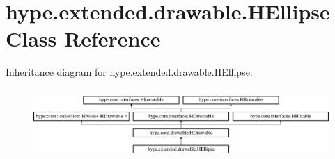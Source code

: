 \hypertarget{classhype_1_1extended_1_1drawable_1_1_h_ellipse}{\section{hype.\-extended.\-drawable.\-H\-Ellipse Class Reference}
\label{classhype_1_1extended_1_1drawable_1_1_h_ellipse}
}
Inheritance diagram for hype.\-extended.\-drawable.\-H\-Ellipse\-:\begin{figure}[H]
\begin{center}
\leavevmode
\includegraphics[height=2.745098cm]{classhype_1_1extended_1_1drawable_1_1_h_ellipse}
\end{center}
\end{figure}
